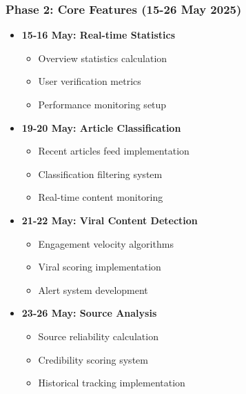 \documentclass[11pt,a4paper]{article}
\begin{document}
\subsubsection{Phase 2: Core Features (15-26 May 2025)}
\begin{itemize}
    \item \textbf{15-16 May: Real-time Statistics}
    \begin{itemize}
        \item Overview statistics calculation
        \item User verification metrics
        \item Performance monitoring setup
    \end{itemize}
    \item \textbf{19-20 May: Article Classification}
    \begin{itemize}
        \item Recent articles feed implementation
        \item Classification filtering system
        \item Real-time content monitoring
    \end{itemize}
    \item \textbf{21-22 May: Viral Content Detection}
    \begin{itemize}
        \item Engagement velocity algorithms
        \item Viral scoring implementation
        \item Alert system development
    \end{itemize}
    \item \textbf{23-26 May: Source Analysis}
    \begin{itemize}
        \item Source reliability calculation
        \item Credibility scoring system
        \item Historical tracking implementation
    \end{itemize}
\end{itemize}
\end{document}
